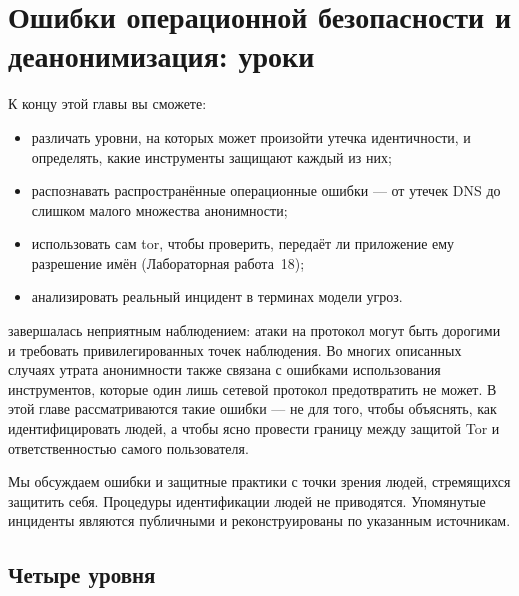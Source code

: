 \chapter{Ошибки операционной безопасности и деанонимизация: уроки}\label{cap:28-opsec}

\begin{obiettivi}
К концу этой главы вы сможете:
\begin{itemize}[nosep]
  \item различать уровни, на которых может произойти утечка идентичности, и определять, какие инструменты защищают каждый из них;
  \item распознавать распространённые операционные ошибки — от утечек DNS до слишком малого множества анонимности;
  \item использовать сам tor, чтобы проверить, передаёт ли приложение ему разрешение имён (Лабораторная работа~18);
  \item анализировать реальный инцидент в терминах модели угроз.
\end{itemize}
\end{obiettivi}

 завершалась неприятным наблюдением: атаки на протокол могут быть дорогими и требовать привилегированных точек наблюдения. Во многих описанных случаях утрата анонимности также связана с ошибками использования инструментов, которые один лишь сетевой протокол предотвратить не может. В этой главе рассматриваются такие ошибки — не для того, чтобы объяснять, как идентифицировать людей, а чтобы ясно провести границу между защитой Tor и ответственностью самого пользователя.

\begin{attenzione}
Мы обсуждаем ошибки и защитные практики с точки зрения людей, стремящихся защитить себя. Процедуры идентификации людей не приводятся. Упомянутые инциденты являются публичными и реконструированы по указанным источникам.
\end{attenzione}

\section{Четыре уровня}\label{sec:opsec-livelli}

